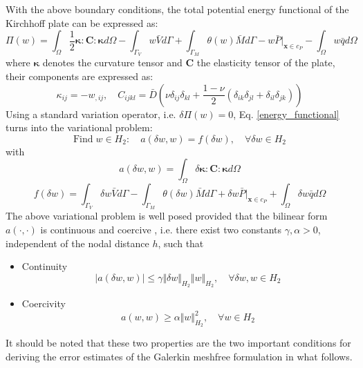 With the above boundary conditions, the total potential energy functional of the Kirchhoff plate can be expressed as:
\begin{equation}\label{energy_functional}
	\Pi(w) = \int_\Omega \frac{1}{2} \boldsymbol \kappa : \boldsymbol C : \boldsymbol \kappa d\Omega
	- \int_{\Gamma_{V}} w \bar V d\Gamma
	+ \int_{\Gamma_{M}} \theta(w) \bar M d\Gamma
	- w \bar P\vert_{\boldsymbol x \in c_P}
	- \int_\Omega w \bar q d\Omega
\end{equation}
where $\boldsymbol \kappa$ denotes the curvature tensor and $\boldsymbol C$ the elasticity tensor of the plate, their components are expressed as:
\begin{equation}\label{curvature}
	\kappa_{ij} =- w_{,ij},\quad
	C_{ijkl}=\bar D\left(\nu \delta_{ij} \delta_{kl} + \frac{1-\nu}{2}\left(\delta_{ik}\delta_{jl} + \delta_{il}\delta_{jk}\right)\right)
\end{equation}
Using a standard variation operator, i.e. $\delta \Pi (w) = 0$, Eq. \eqref{energy_functional} turns into the variational problem:
\begin{equation}\label{weakform}
	\textrm{Find}\; w \in H_2: \quad a(\delta w, w) = f(\delta w) ,\quad \forall \delta w \in H_2
\end{equation}
with
\begin{equation}\label{bilinear}
	a(\delta w, w) = \int_\Omega \delta \boldsymbol \kappa : \boldsymbol C : \boldsymbol \kappa d\Omega
\end{equation}
\begin{equation}\label{linear}
	f(\delta w) =
	\int_{\Gamma_{V}} \delta w \bar V d\Gamma
	- \int_{\Gamma_{M}} \theta(\delta w) \bar M d\Gamma
	+ \delta w \bar P\vert_{\boldsymbol x \in c_P}
	+ \int_\Omega \delta w \bar q d\Omega
\end{equation}
The above variational problem is well posed provided that the bilinear form $a(\cdot,\cdot)$ is continuous and coercive \cite{}, i.e. there exist two constants $\gamma,\alpha>0$, independent of the nodal distance $h$, such that

\begin{itemize}
\item Continuity
\begin{equation}\label{continuity}
	\left| a(\delta w, w) \right| \le \gamma \Vert \delta w \Vert_{H_2} \Vert w \Vert_{H_2}, \quad \forall \delta w, w \in H_2
\end{equation}

\item Coercivity
\begin{equation}\label{coercivity}
	a(w, w) \ge \alpha \Vert w \Vert_{H_2}^2, \quad \forall w \in H_2
\end{equation}
\end{itemize}
It should be noted that these two properties are the two important conditions for deriving the error estimates of the Galerkin meshfree formulation in what follows.

